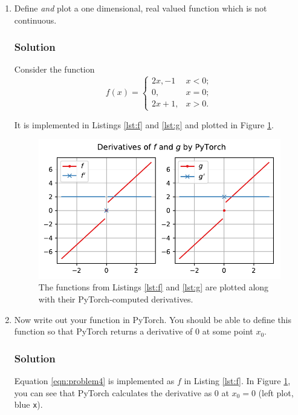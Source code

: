 \documentclass[letterpaper,11pt]{article}
\begin{document}
\begin{enumerate}
\item Define \emph{and} plot a one dimensional, real valued function
  which is not continuous.
  
  \subsubsection*{Solution}
  Consider the function
  \begin{equation}
    f(x) = \begin{cases}
      2x, - 1& x < 0; \\
      0, & x = 0; \\
      2x + 1, & x > 0.
    \end{cases}
    \label{eqn:problem4}
  \end{equation}

  It is implemented in Listings \ref{lst:f} and \ref{lst:g} and plotted in
  Figure \ref{fig:problem4}.

  \begin{figure}[h]
    \centering
    \includegraphics{problem4/problem4.pdf}
    \caption{The functions from Listings \ref{lst:f} and \ref{lst:g} are plotted
      along with their PyTorch-computed derivatives.}
    \label{fig:problem4}
  \end{figure}
\item Now write out your function in PyTorch. You should be able to
  define this function so that PyTorch returns a derivative of $0$ at
  some point $x_0$.
  \subsubsection*{Solution}
  Equation \ref{eqn:problem4} is implemented as $f$ in Listing
  \ref{lst:f}. In Figure \ref{fig:problem4}, you can see that PyTorch
  calculates the derivative as $0$ at $x_0 = 0$ (left plot, blue
  \texttt{x}).
  

\end{enumerate}
\end{document}
